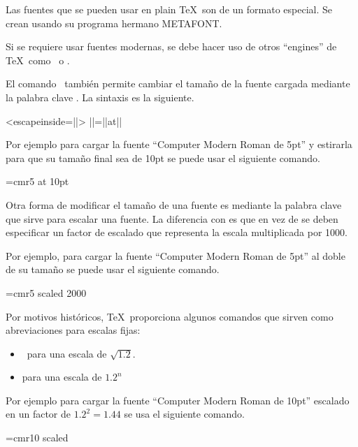\begin{notebox}
  Las fuentes que se pueden usar en plain \TeX\ son de un formato especial. Se crean usando su programa hermano METAFONT.

  Si se requiere usar fuentes modernas, se debe hacer uso de otros ``engines'' de \TeX\ como \XeTeX\ o \LuaTeX.
\end{notebox}

El comando \texcs\font\ también permite cambiar el tamaño de la fuente cargada mediante la palabra clave . La sintaxis es la siguiente.
\begin{texcode}<escapeinside=||>
  \font||=||at||
\end{texcode}

Por ejemplo para cargar la fuente ``Computer Modern Roman de 5pt'' y estirarla para que su tamaño final sea de 10pt se puede usar el siguiente comando.
\begin{texcode}
  \font\magnifiedfiverm=cmr5 at 10pt
\end{texcode}

Otra forma de modificar el tamaño de una fuente es mediante la palabra clave  que sirve para escalar una fuente. La diferencia con  es que en vez de  se deben especificar un factor de escalado que representa la escala multiplicada por 1000.

Por ejemplo, para cargar la fuente ``Computer Modern Roman de 5pt'' al doble de su tamaño se puede usar el siguiente comando.
\begin{texcode}
  \font\magnifiedfiverm=cmr5 scaled 2000
\end{texcode}

Por motivos históricos, \TeX\ proporciona algunos comandos que sirven como abreviaciones para escalas fijas:
\begin{itemize}
  \item \texcs\magstephalf\ para una escala de $\sqrt{1.2}$.

  \item \texcs\magstep{} para una escala de $1.2^n$
\end{itemize}

Por ejemplo para cargar la fuente ``Computer Modern Roman de 10pt'' escalado en un factor de $1.2^2 = 1.44$ se usa el siguiente comando.
\begin{texcode}
  \font\bigtenrm=cmr10 scaled
\end{texcode}
